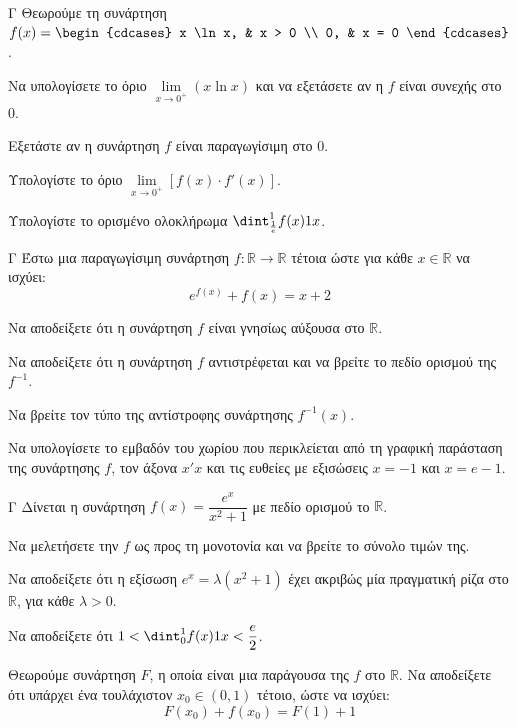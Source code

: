 \begin{thema}{Γ}
Θεωρούμε τη συνάρτηση $f(x) = \begin{cdcases} x \ln x, & x > 0 \\ 0, & x = 0 \end{cdcases}$.
\begin{erwthma}
  \item Να υπολογίσετε το όριο $\lim\limits_{x\to 0^+} (x \ln x)$ και να εξετάσετε αν η $f$ είναι συνεχής στο $0$.
  \item Εξετάστε αν η συνάρτηση $f$ είναι παραγωγίσιμη στο $0$.
  \item Υπολογίστε το όριο $\lim\limits_{x \to 0^+} [ f(x) \cdot f'(x) ]$.
  \item Υπολογίστε το ορισμένο ολοκλήρωμα $\dint_{\frac{1}{e}}^1 f(x)\d x$.
\end{erwthma}
\end{thema}

\begin{thema}{Γ}
Έστω μια παραγωγίσιμη συνάρτηση $f: \mathbb{R} \to \mathbb{R}$ τέτοια ώστε για κάθε $x \in \mathbb{R}$ να ισχύει:
$$ e^{f(x)} + f(x) = x + 2 $$
\begin{erwthma}
  \item Να αποδείξετε ότι η συνάρτηση $f$ είναι γνησίως αύξουσα στο $\mathbb{R}$.
  \item Να αποδείξετε ότι η συνάρτηση $f$ αντιστρέφεται και να βρείτε το πεδίο ορισμού της $f^{-1}$.
  \item Να βρείτε τον τύπο της αντίστροφης συνάρτησης $f^{-1}(x)$.
  \item Να υπολογίσετε το εμβαδόν του χωρίου που περικλείεται από τη γραφική παράσταση της συνάρτησης $f$, τον άξονα $x'x$ και τις ευθείες με εξισώσεις $x = -1$ και $x = e - 1$.
\end{erwthma}
\end{thema}

\begin{thema}{Γ}
Δίνεται η συνάρτηση $f(x) = \dfrac{e^x}{x^2+1}$ με πεδίο ορισμού το $\mathbb{R}$.
\begin{erwthma}
  \item Να μελετήσετε την $f$ ως προς τη μονοτονία και να βρείτε το σύνολο τιμών της.
  \item Να αποδείξετε ότι η εξίσωση $e^x = \lambda(x^2+1)$ έχει ακριβώς μία πραγματική ρίζα στο $\mathbb{R}$, για κάθε $\lambda > 0$.
  \item Να αποδείξετε ότι $1 < \dint_0^1 f(x) \d x < \dfrac{e}{2}$.
  \item Θεωρούμε συνάρτηση $F$, η οποία είναι μια παράγουσα της $f$ στο $\mathbb{R}$. Να αποδείξετε ότι υπάρχει ένα τουλάχιστον $x_0 \in (0, 1)$ τέτοιο, ώστε να ισχύει: $$F(x_0) + f(x_0) = F(1) + 1$$
\end{erwthma}
\end{thema}


